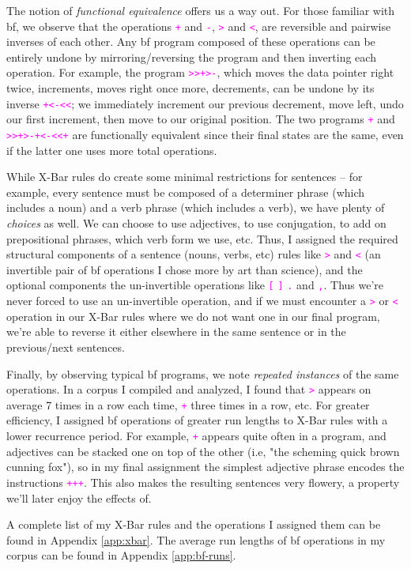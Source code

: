 \documentclass[runningheads]{llncs}
\newcommand{\code}[1]{\texttt{\textcolor{magenta}{\setlength{\fboxsep}{1pt}\colorbox{lightgray!20}{#1}}}}
\begin{document}
The notion of \textit{functional equivalence} offers us a way out. For those familiar with bf, we observe that the operations \code{+} and \code{-}, \code{>} and \code{<}, are reversible and pairwise inverses of each other. Any bf program composed of these operations can be entirely undone by mirroring/reversing the program and then inverting each operation. For example, the program \code{>>+>-}, which moves the data pointer right twice, increments, moves right once more, decrements, can be undone by its inverse \code{+<-<<}; we immediately increment our previous decrement, move left, undo our first increment, then move to our original position. The two programs \code{+} and \code{>>+>-+<-<<+} are functionally equivalent since their final states are the same, even if the latter one uses more total operations.

While X-Bar rules do create some minimal restrictions for sentences -- for example, every sentence must be composed of a determiner phrase (which includes a noun) and a verb phrase (which includes a verb), we have plenty of \textit{choices} as well. We can choose to use adjectives, to use conjugation, to add on prepositional phrases, which verb form we use, etc. Thus, I assigned the required structural components of a sentence (nouns, verbs, etc) rules like \code{>} and \code{<} (an invertible pair of bf operations I chose more by art than science), and the optional components the un-invertible operations like \code{[} \code{]} \code{.} and \code{,}. Thus we're never forced to use an un-invertible operation, and if we must encounter a \code{>} or \code{<} operation in our X-Bar rules where we do not want one in our final program, we're able to reverse it either elsewhere in the same sentence or in the previous/next sentences.

Finally, by observing typical bf programs, we note \textit{repeated instances} of the same operations. In a corpus I compiled and analyzed, I found that \code{>} appears on average 7 times in a row each time, \code{+} three times in a row, etc. For greater efficiency, I assigned bf operations of greater run lengths to X-Bar rules with a lower recurrence period. For example, \code{+} appears quite often in a program, and adjectives can be stacked one on top of the other (i.e, "the scheming quick brown cunning fox"), so in my final assignment the simplest adjective phrase encodes the instructions \code{+++}. This also makes the resulting sentences very flowery, a property we'll later enjoy the effects of.

A complete list of my X-Bar rules and the operations I assigned them can be found in Appendix \ref{app:xbar}. The average run lengths of bf operations in my corpus can be found in Appendix \ref{app:bf-runs}.
\end{document}
